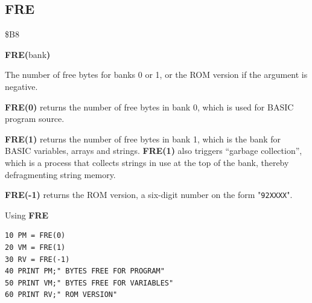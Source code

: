 
\newpage
\subsection{FRE}
\begin{description}[leftmargin=2cm,style=nextline]
\item [Token:]    \$B8
\item [Format:]   {\bf FRE(}bank{\bf)}
\item [Returns:]  The number of free bytes for banks 0 or 1, or the ROM version if the argument is negative.

                  {\bf FRE(0)} returns the number of free bytes in bank 0, which is used for BASIC program source.

                  {\bf FRE(1)} returns the number of free bytes in bank 1, which is the bank for BASIC variables, arrays and strings. {\bf FRE(1)} also triggers ``garbage collection'', which is a process that collects strings in use at the top of the bank, thereby defragmenting string memory.

                  {\bf FRE(-1)} returns the ROM version, a six-digit number on the form "\texttt{92XXXX}".

\item [Example:]  Using {\bf FRE}

\begin{tcolorbox}[colback=black,coltext=white]
\verbatimfont{\codefont}
\begin{verbatim}
10 PM = FRE(0)
20 VM = FRE(1)
30 RV = FRE(-1)
40 PRINT PM;" BYTES FREE FOR PROGRAM"
50 PRINT VM;" BYTES FREE FOR VARIABLES"
60 PRINT RV;" ROM VERSION"
\end{verbatim}
\end{tcolorbox}
\end{description}


\newpage

